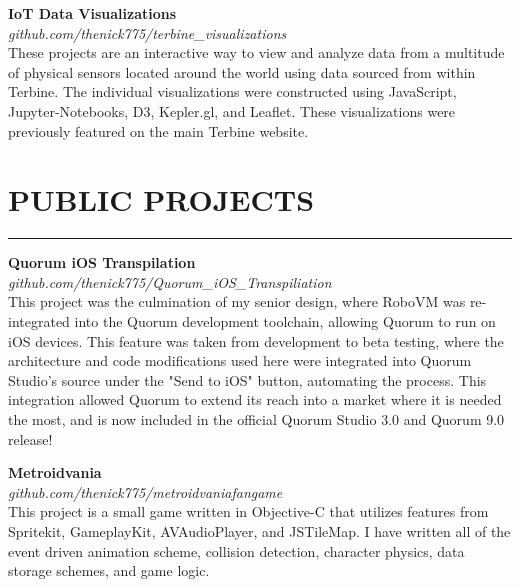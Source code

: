 \documentclass{res}
\begin{document}
\begin{resume}
\begin{comment}
		{\bf Ingestion Index Crawler} \hfill \vspace{5pt}\\
			This crawler is designed to reduce search times of already ingested Terbine searcher data. It crawls all instances for a specified user, and produces a list that can be easily and quickly searched. This software was built using Docker and Selenium in Python.
\vspace{-5pt}
\end{comment}

		{\bf IoT Data Visualizations} \\
    \emph{github.com/thenick775/terbine\_visualizations} \hfill \vspace{4pt}\\
			These projects are an interactive way to view and analyze data from a multitude of physical sensors located around the world using data sourced from within Terbine. The individual visualizations were constructed using JavaScript, Jupyter-Notebooks, D3, Kepler.gl, and Leaflet. These visualizations were previously featured on the main Terbine website.

\vspace{-3pt}

		\section{{PUBLIC PROJECTS}}
    \noindent\rule[0.5ex]{\linewidth}{1pt}
		{\bf Quorum iOS Transpilation} \\
			\emph{github.com/thenick775/Quorum\_iOS\_Transpiliation} \hfill \vspace{2.5pt}\\
			This project was the culmination of my senior design, where RoboVM was re-integrated into the Quorum development toolchain, allowing Quorum to run on iOS devices. This feature was taken from development to beta testing, where the architecture and code modifications used here were integrated into Quorum Studio's source under the "Send to iOS" button, automating the process. This integration allowed Quorum to extend its reach into a market where it is needed the most, and is now included in the official Quorum Studio 3.0 and Quorum 9.0 release!
\vspace{-5pt}

		{\bf Metroidvania} \\
			\emph{github.com/thenick775/metroidvaniafangame} \hfill \vspace{3pt} \\
			This project is a small game written in Objective-C that utilizes features from Spritekit, GameplayKit, AVAudioPlayer, and JSTileMap. I have written all of the event driven animation scheme, collision detection, character physics, data storage schemes, and game logic.
\vspace{-4pt}


\end{resume}
\end{document}
